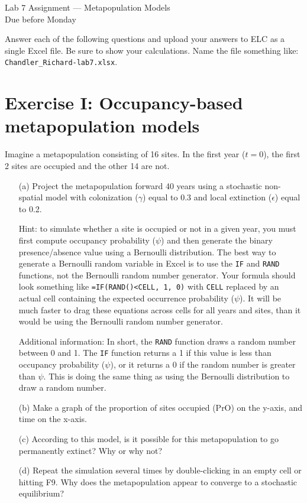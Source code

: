 \documentclass[12pt]{article}\usepackage[]{graphicx}\usepackage[]{color}
\begin{document}
{
  \Large
  \centering
  Lab 7 Assignment --- Metapopulation Models \\
  Due before Monday \\
}

Answer each of the following questions and upload your answers to ELC
as a single Excel file. Be sure to show your calculations. Name the
file something like: \texttt{Chandler\_Richard-lab7.xlsx}. \\



\vspace{12pt}

\section*{Exercise I: Occupancy-based metapopulation models}


Imagine a metapopulation consisting of 16 sites. In the first year
($t=0$), the first 2 sites are occupied and the other 14 are not.
\begin{enumerate}
  \item[(a)] Project the metapopulation forward 40 years using a
    stochastic non-spatial model with colonization ($\gamma$) equal to
    0.3 and local extinction ($\epsilon$) equal to 0.2.

    Hint: to simulate whether a site is occupied or not in a given year,
    you must first compute occupancy probability ($\psi$) and then generate
    the binary presence/absence value using a Bernoulli distribution. The
    best way to generate a Bernoulli random variable in Excel is to use
    the \texttt{IF} and \texttt{RAND} functions, not the Bernoulli
    random number generator. Your formula should look something like
    \texttt{=IF(RAND()<CELL, 1, 0)} with \texttt{CELL} replaced by an
    actual cell containing the expected occurrence probability
    ($\psi$). It will be much faster to drag these equations across
    cells for all years and sites, than it would be using the
    Bernoulli random number generator.

    Additional information: In short, the \texttt{RAND} function draws a
    random number between 0 and 1. The \texttt{IF} function returns a 1 if
    this value is less than occupancy probability ($\psi$), or it returns
    a 0 if the random number is greater than $\psi$. This is doing the
    same thing as using the Bernoulli distribution to draw a random
    number.
  \item[(b)] Make a graph of the proportion of sites occupied (PrO)
    on the y-axis, and time on the x-axis.
  \item[(c)] According to this model, is it possible for this
    metapopulation to go permanently extinct? Why or why not?
  \item[(d)] Repeat the simulation several times by double-clicking in
    an empty cell or hitting F9. Why does the metapopulation appear to
    converge to a stochastic equilibrium?
\end{enumerate}
\end{document}
